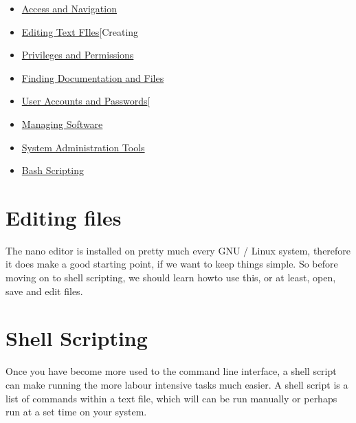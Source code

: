 \documentclass{extbook}
\begin{document}
\begin{itemize}
\item \href{https://invidious.snopyta.org/watch?v=eH8Z9zeywq0}{Access and Navigation}  
\item \href{https://invidious.snopyta.org/watch?v=eH8Z9zeywq0}{Editing Text FIles}[Creating 
\item \href{https://invidious.snopyta.org/watch?v=s23NqWKxOXk}{Privileges and Permissions} 
\item \href{https://invidious.snopyta.org/watch?v=4r7V2-EBnR0}{Finding Documentation and Files}
\item \href{https://invidious.snopyta.org/watch?v=XVCf0cou6EU}{User Accounts and Passwords}[ 
\item \href{https://invidious.snopyta.org/watch?v=lNyJllHk2SA}{Managing Software}
\item \href{https://invidious.snopyta.org/watch?v=4\_21KZ3qKEI7}{System Administration Tools}
\item \href{https://invidious.snopyta.org/watch?v=57sp8Y0GL40}{Bash Scripting}
\end{itemize}


\section{Editing files}

The nano editor is installed on pretty much every GNU / Linux system,  therefore it does make a good starting point, if we want to keep things simple.  So before moving on to shell scripting, we should learn howto use this, or at least, open, save and edit files. 

\begin{itemize}
\item \href{https://www.nano-editor.org/}{Nano Editor website}
\item \href{https://www.youtube.com/watch?v=cLyUZAabf40}{Youtube video - beginners guide to nano}}
\item \href{https://www.nano-editor.org/dist/latest/cheatsheet.html}{Nano Cheat sheet} 

\end{itemize}

\section{Shell Scripting}

Once you have become more used to the command line interface, a shell script can make running the more labour intensive tasks much easier.  A shell script is a list of commands within a text file, which will can be run manually or perhaps run at a set time on your system.
\end{document}
